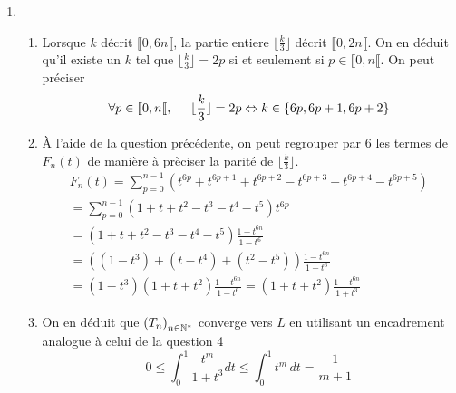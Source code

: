 \begin{enumerate}
  \item
\begin{enumerate}
  \item Lorsque $k$ décrit $\llbracket 0,6n \llbracket$, la partie entiere $\lfloor \frac{k}{3}\rfloor$ décrit $\llbracket 0, 2n \llbracket$.\newline
On en déduit qu'il existe un $k$ tel que $\lfloor \frac{k}{3}\rfloor = 2p$ si et seulement si $p\in \llbracket 0, n \llbracket$. On peut préciser
\begin{displaymath}
\forall p \in \llbracket 0, n \llbracket,\hspace{0.5cm}   \lfloor \frac{k}{3}\rfloor = 2p \Leftrightarrow k\in \left\lbrace 6p,6p+1, 6p+2\right\rbrace 
\end{displaymath}
 
  \item \`A l'aide de la question précédente, on peut regrouper par $6$ les termes de $F_n(t)$ de manière à prèciser la parité de $\lfloor \frac{k}{3}\rfloor$.
\begin{multline*}
  F_n(t) = \sum_{p=0}^{n-1}\left( t^{6p}+t^{6p+1}+t^{6p+2} - t^{6p+3}-t^{6p+4}-t^{6p+5}\right)\\
= \sum_{p=0}^{n-1} \left(1+t+t^2 -t^3 -t^4 -t^5 \right)t^{6p} \\
= \left(1+t+t^2 -t^3 -t^4 -t^5 \right) \frac{1-t^{6n}}{1-t^6} \\
=\left((1-t^3) + (t-t^4) + (t^2 -t^5) \right) \frac{1-t^{6n}}{1-t^6}\\
=(1-t^3)(1+t+t^2)\frac{1-t^{6n}}{1-t^6} 
= (1+t+t^2)\frac{1-t^{6n}}{1+t^3}
\end{multline*}

  \item On en déduit que $\left( T_n\right)_{n\in \mathbb{N}^*}$ converge vers $L$ en utilisant un encadrement analogue à celui de la question 4
\begin{displaymath}
  0 \leq \int_0^1 \frac{t^m}{1+t^3}dt \leq \int_0^1 t^m\,dt = \frac{1}{m+1}
\end{displaymath}

\end{enumerate}

\end{enumerate}
